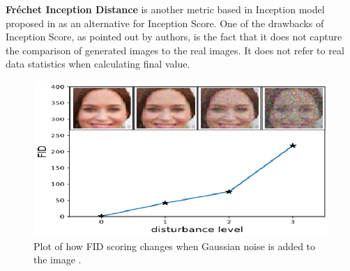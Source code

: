 \documentclass[11pt,a4paper,openany]{book}
\begin{document}
%
%
%
%
%

\noindent \textbf{Fr\'echet Inception Distance} is another metric based in Inception model proposed in \cite{fid} as an alternative for Inception Score. One of the drawbacks of Inception Score, as pointed out by authors, is the fact that it does not capture the comparison of generated images to the real images. It does not refer to real data statistics when calculating final value.

 \begin{figure}[ht!]
     \centering
     \includegraphics[scale=1.6]{figs/fid.eps}
     \caption{Plot of how FID scoring changes when Gaussian noise is added to the image \cite{fid}.}\label{Fig:FID}
 \end{figure}
 
\end{document}
